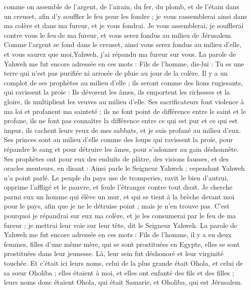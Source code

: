 \begin{multicols}{2}
comme on assemble de l'argent, de l'airain, du fer, du plomb, et de l'étain dans un creuset, afin d'y souffler le feu pour les fondre ; je vous rassemblerai ainsi dans ma colère et dans ma fureur, et je vous fondrai.
Je vous assemblerai, je soufflerai contre vous le feu de ma fureur, et vous serez fondus au milieu de Jérusalem.
Comme l'argent se fond dans le creuset, ainsi vous serez fondus au milieu d'elle, et vous saurez que moi,Yahweh, j'ai répandu ma fureur sur vous.
La parole de Yahweh me fut encore adressée en ces mots :
Fils de l’homme, dis-lui : Tu es une terre qui n’est pas purifiée ni arrosée de pluie au jour de la colère.
Il y a un complot de ses prophètes au milieu d'elle ; ils seront comme des lions rugissants, qui ravissent la proie : Ils dévorent les âmes, ils emportent les richesses et la gloire, ils multiplient les veuves au milieu d'elle.
Ses sacrificateurs font violence à ma loi et profanent ma sainteté ; ils ne font point de différence entre le saint et le profane, ils ne font pas connaître la différence entre ce qui est pur et ce qui est impur, ils cachent leurs yeux de mes sabbats, et je suis profané au milieu d'eux.
Ses princes sont au milieu d'elle comme des loups qui ravissent la proie, pour répandre le sang et pour détruire les âmes, pour s'adonner au gain déshonnête.
Ses prophètes ont pour eux des enduits de plâtre, des visions fausses, et des oracles menteurs, en disant : Ainsi parle le Seigneur Yahweh ; cependant Yahweh n'a point parlé.
Le peuple du pays use de tromperies, ravit le bien d'autrui, opprime l'affligé et le pauvre, et foule l'étranger contre tout droit.
Je cherche parmi eux un homme qui élève un mur, et qui se tient à la brèche devant moi pour le pays, afin que je ne le détruise point ; mais je n'en trouve pas.
C'est pourquoi je répandrai sur eux ma colère, et je les consumerai par le feu de ma fureur ; je mettrai leur voie sur leur tête, dit le Seigneur Yahweh.
\VerseOne{}La parole de Yahweh me fut encore adressée en ces mots :
Fils de l’homme, il y a eu deux femmes, filles d'une même mère,
qui se sont prostituées en Egypte, elles se sont prostituées dans leur jeunesse. Là, leur sein fut déshonoré et leur virginité touchée.
Et c'était ici leurs noms, celui de la plus grande était Ohola, et celui de sa sœur Oholiba ; elles étaient à moi, et elles ont enfanté des fils et des filles ; leurs noms donc étaient Ohola, qui était Samarie, et Oholiba, qui est Jérusalem.

\end{multicols}
